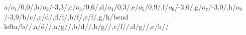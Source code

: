 \begin{compatibilitygraph}{a/$o_1$/{0,0}/,b/$o_2$/{-3,3}/,c/$o_3$/{0,6}/,d/$o_4$/{0,3}/,e/$o_5$/{0,9}/,f/$o_6$/{-3,6}/,g/$o_7$/{-3,0}/,h/$o_8$/{-3,9}/}{b/c/,c/d/,d/f/,b/f/,e/f/,g/h/bend left}{a/b//,a/d//,a/g//,b/d//,b/g//,c/f//,d/g//,e/h//}{}{}
\end{compatibilitygraph}